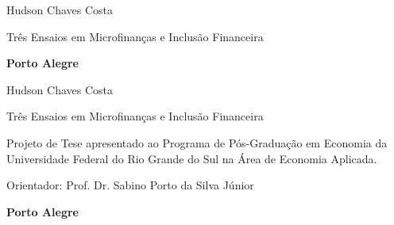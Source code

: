 \documentclass[twoside,a4paper,11pt]{report}
\newcommand{\nomedoaluno}{Hudson Chaves Costa}
\newcommand{\titulo}{Três Ensaios em Microfinanças e Inclusão Financeira}
\begin{document}

\pagestyle{empty}

\begin{titlepage}


\begin{center}
{\LARGE \nomedoaluno}
\par
\vspace{200pt}
{\Huge \titulo}
\par
\vfill
\textbf{{\large Porto Alegre}\\
{\large \the\year}}
\end{center}
\end{titlepage}

\cleardoublepage




\thispagestyle{empty}

\begin{center}
{\LARGE \nomedoaluno}
\par
\vspace{200pt}
{\Huge \titulo}
\end{center}
\par
\vspace{90pt}
\hspace*{175pt}\parbox{7.6cm}{{\large Projeto de Tese apresentado ao Programa de Pós-Graduação em Economia da Universidade Federal do Rio Grande do Sul na Área de Economia Aplicada.}}

\par
\vspace{1em}
\hspace*{175pt}\parbox{7.6cm}{{\large Orientador: Prof. Dr. Sabino Porto da Silva Júnior}}

\par
\vfill
\begin{center}
\textbf{{\large Porto Alegre}\\
{\large \the\year}}
\end{center}
\end{document}
